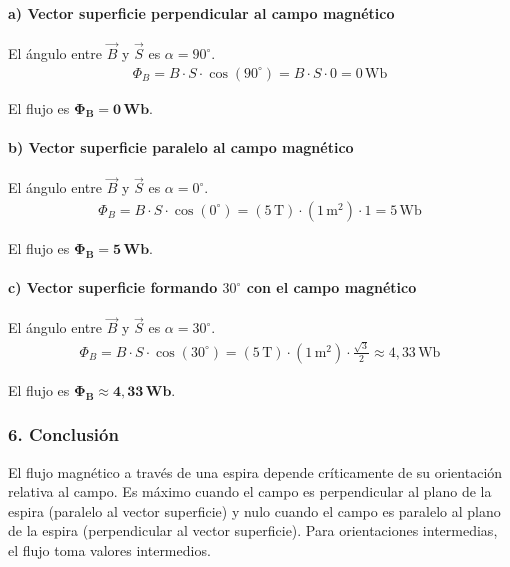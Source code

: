 \paragraph*{a) Vector superficie perpendicular al campo magnético}
El ángulo entre $\vec{B}$ y $\vec{S}$ es $\alpha = 90^\circ$.
\begin{gather}
    \Phi_B = B \cdot S \cdot \cos(90^\circ) = B \cdot S \cdot 0 = 0 \, \text{Wb}
\end{gather}
\begin{cajaresultado}
    El flujo es $\boldsymbol{\Phi_B = 0 \, \textbf{Wb}}$.
\end{cajaresultado}

\paragraph*{b) Vector superficie paralelo al campo magnético}
El ángulo entre $\vec{B}$ y $\vec{S}$ es $\alpha = 0^\circ$.
\begin{gather}
    \Phi_B = B \cdot S \cdot \cos(0^\circ) = (5 \, \text{T}) \cdot (1 \, \text{m}^2) \cdot 1 = 5 \, \text{Wb}
\end{gather}
\begin{cajaresultado}
    El flujo es $\boldsymbol{\Phi_B = 5 \, \textbf{Wb}}$.
\end{cajaresultado}

\paragraph*{c) Vector superficie formando $30^\circ$ con el campo magnético}
El ángulo entre $\vec{B}$ y $\vec{S}$ es $\alpha = 30^\circ$.
\begin{gather}
    \Phi_B = B \cdot S \cdot \cos(30^\circ) = (5 \, \text{T}) \cdot (1 \, \text{m}^2) \cdot \frac{\sqrt{3}}{2} \approx 4,33 \, \text{Wb}
\end{gather}
\begin{cajaresultado}
    El flujo es $\boldsymbol{\Phi_B \approx 4,33 \, \textbf{Wb}}$.
\end{cajaresultado}

\subsubsection*{6. Conclusión}
\begin{cajaconclusion}
El flujo magnético a través de una espira depende críticamente de su orientación relativa al campo. Es máximo cuando el campo es perpendicular al plano de la espira (paralelo al vector superficie) y nulo cuando el campo es paralelo al plano de la espira (perpendicular al vector superficie). Para orientaciones intermedias, el flujo toma valores intermedios.
\end{cajaconclusion}

